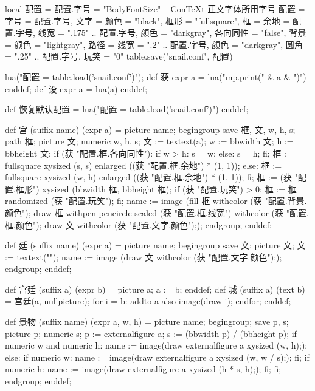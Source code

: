 \startluacode
local 配置 = {}
配置.字号 = "BodyFontSize" -- ConTeXt 正文字体所用字号
配置 = {
    字号 = 配置.字号,
    文字 = {颜色 = "black"},
    框形 = "fullsquare",
    框 = {余地 = 配置.字号, 线宽 = ".175" .. 配置.字号, 颜色 = "darkgray", 各向同性 = "false"},
    背景 = {颜色 = "lightgray"},
    路径 = {线宽 = ".2" .. 配置.字号, 颜色 = "darkgray", 圆角 = ".25" .. 配置.字号},
    玩笑 = "0"
}
table.save("snail.conf", 配置)
\stopluacode

\startMPinclusions
lua("配置 = table.load('snail.conf')");
def 获 expr a = lua("mp.print(" & a & ")") enddef;
def 设 expr a = lua(a) enddef;

def 恢复默认配置 =
  lua("配置 = table.load('snail.conf')")
enddef;
\stopMPinclusions

\startMPinclusions[+]
def 宫 (suffix name) (expr a) =
  picture name;
  begingroup
    save 框, 文, w, h, s;
    path 框; picture 文; numeric w, h, s;
    文 := textext(a);
    w := bbwidth 文; h := bbheight 文;
    if (获 "配置.框.各向同性"):
      if w > h: s = w; else: s = h; fi;
      框 := fullsquare xysized (s, s) enlarged ((获 "配置.框.余地") * (1, 1));
    else:
      框 := fullsquare xysized (w, h) enlarged ((获 "配置.框.余地") * (1, 1));
    fi;
    框 := (获 "配置.框形") xysized (bbwidth 框, bbheight 框);
    if (获 "配置.玩笑") > 0: 框 := 框 randomized (获 "配置.玩笑"); fi;
    name := image (fill 框 withcolor (获 "配置.背景.颜色");
                   draw 框 withpen pencircle scaled (获 "配置.框.线宽")
                           withcolor (获 "配置.框.颜色");
                   draw 文 withcolor (获 "配置.文字.颜色"););
  endgroup;
enddef;
\stopMPinclusions

\startMPinclusions[+]
  def 廷 (suffix name) (expr a) =
    picture name;
    begingroup
    save 文; picture 文; 文 := textext("");
    name := image (draw 文 withcolor (获 "配置.文字.颜色"););
    endgroup;
enddef;
\stopMPinclusions

\startMPinclusions[+]
def 宫廷 (suffix a) (expr b) = picture a; a := b; enddef;
def 城 (suffix a) (text b) =
  宫廷(a, nullpicture);
  for i = b: addto a also image(draw i); endfor;
enddef;
\stopMPinclusions

\startMPinclusions[+]
def 景物 (suffix name) (expr a, w, h) =
  picture name;
  begingroup;
  save p, s; picture p; numeric s;
  p := externalfigure a;
  s := (bbwidth p) / (bbheight p);
  if numeric w and numeric h:
    name := image(draw externalfigure a xysized (w, h););
  else:
    if numeric w:
      name := image(draw externalfigure a xysized (w, w / s););
    fi;
    if numeric h:
       name := image(draw externalfigure a xysized (h * s, h););
    fi;
  fi;
  endgroup;
enddef;
\stopMPinclusions
  

